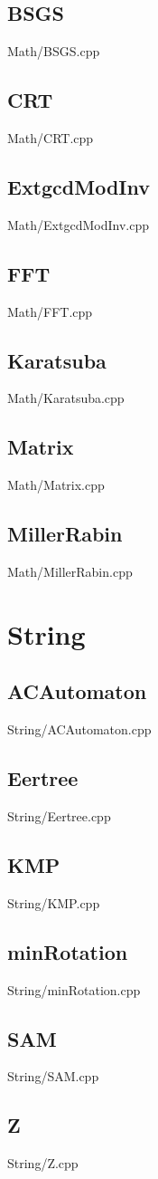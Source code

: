     \subsection{BSGS}
         {Math/BSGS.cpp}
    \subsection{CRT}
         {Math/CRT.cpp}
    \subsection{ExtgcdModInv}
         {Math/ExtgcdModInv.cpp}
    \subsection{FFT}
         {Math/FFT.cpp}
    \subsection{Karatsuba}
         {Math/Karatsuba.cpp}
    \subsection{Matrix}
         {Math/Matrix.cpp}
    \subsection{MillerRabin}
         {Math/MillerRabin.cpp}

\section{String}
    \subsection{ACAutomaton}
         {String/ACAutomaton.cpp}
    \subsection{Eertree}
         {String/Eertree.cpp}
    \subsection{KMP}
         {String/KMP.cpp}
    \subsection{minRotation}
         {String/minRotation.cpp}
    \subsection{SAM}
         {String/SAM.cpp}
    \subsection{Z}
         {String/Z.cpp}
